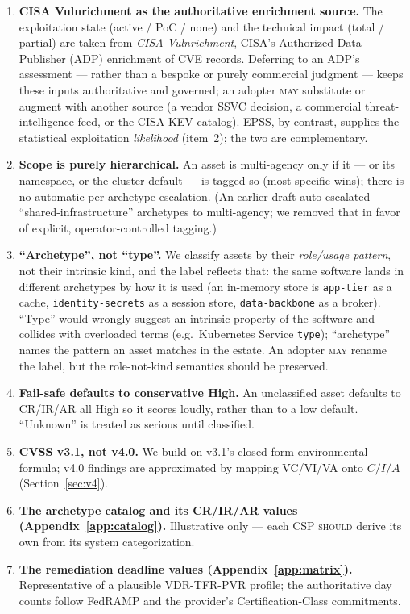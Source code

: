 \documentclass[11pt]{article}
\newcommand{\code}[1]{\texttt{#1}}
\newcommand{\rfckw}[1]{\textsc{#1}}
\begin{document}
\begin{enumerate}[leftmargin=1.7em]
  fallback; we reversed that.)
\item \textbf{CISA Vulnrichment as the authoritative enrichment source.} The
  exploitation state (active / PoC / none) and the technical impact (total / partial)
  are taken from \emph{CISA Vulnrichment}, CISA's Authorized Data Publisher (ADP)
  enrichment of CVE records. Deferring to an ADP's assessment --- rather than a
  bespoke or purely commercial judgment --- keeps these inputs authoritative and
  governed; an adopter \rfckw{may} substitute or augment with another source (a
  vendor SSVC decision, a commercial threat-intelligence feed, or the CISA KEV
  catalog). EPSS, by contrast, supplies the statistical exploitation \emph{likelihood}
  (item~2); the two are complementary.
\item \textbf{Scope is purely hierarchical.} An asset is multi-agency only if it ---
  or its namespace, or the cluster default --- is tagged so (most-specific wins);
  there is no automatic per-archetype escalation. (An earlier draft auto-escalated
  ``shared-infrastructure'' archetypes to multi-agency; we removed that in favor of
  explicit, operator-controlled tagging.)
\item \textbf{``Archetype'', not ``type''.} We classify assets by their
  \emph{role/usage pattern}, not their intrinsic kind, and the label reflects that:
  the same software lands in different archetypes by how it is used (an in-memory
  store is \code{app-tier} as a cache, \code{identity-secrets} as a session store,
  \code{data-backbone} as a broker). ``Type'' would wrongly suggest an intrinsic
  property of the software and collides with overloaded terms (e.g.\ Kubernetes
  Service \code{type}); ``archetype'' names the pattern an asset matches in the
  estate. An adopter \rfckw{may} rename the label, but the role-not-kind semantics
  should be preserved.
\item \textbf{Fail-safe defaults to conservative High.} An unclassified asset defaults
  to CR/IR/AR all High so it scores loudly, rather than to a low default. ``Unknown''
  is treated as serious until classified.
\item \textbf{CVSS v3.1, not v4.0.} We build on v3.1's closed-form environmental
  formula; v4.0 findings are approximated by mapping VC/VI/VA onto $C/I/A$
  (Section~\ref{sec:v4}).
\item \textbf{The archetype catalog and its CR/IR/AR values
  (Appendix~\ref{app:catalog}).} Illustrative only --- each CSP \rfckw{should} derive
  its own from its system categorization.
\item \textbf{The remediation deadline values (Appendix~\ref{app:matrix}).}
  Representative of a plausible VDR-TFR-PVR profile; the authoritative day counts
  follow FedRAMP and the provider's Certification-Class commitments.
\end{enumerate}
\end{document}
